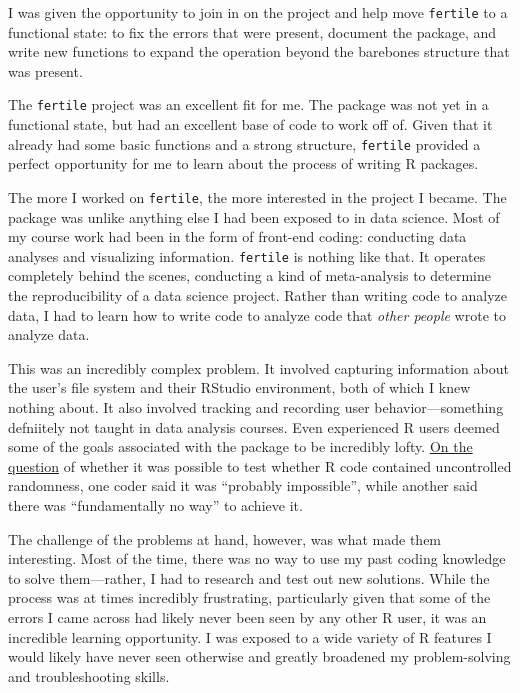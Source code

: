 \documentclass[12pt,twoside]{reedthesis}
\begin{document}
I was given the opportunity to join in on the project and help move \texttt{fertile} to a functional state: to fix the errors that were present, document the package, and write new functions to expand the operation beyond the barebones structure that was present.

The \texttt{fertile} project was an excellent fit for me. The package was not yet in a functional state, but had an excellent base of code to work off of. Given that it already had some basic functions and a strong structure, \texttt{fertile} provided a perfect opportunity for me to learn about the process of writing R packages.

The more I worked on \texttt{fertile}, the more interested in the project I became. The package was unlike anything else I had been exposed to in data science. Most of my course work had been in the form of front-end coding: conducting data analyses and visualizing information. \texttt{fertile} is nothing like that. It operates completely behind the scenes, conducting a kind of meta-analysis to determine the reproducibility of a data science project. Rather than writing code to analyze data, I had to learn how to write code to analyze code that \emph{other people} wrote to analyze data.

This was an incredibly complex problem. It involved capturing information about the user's file system and their RStudio environment, both of which I knew nothing about. It also involved tracking and recording user behavior---something defniitely not taught in data analysis courses. Even experienced R users deemed some of the goals associated with the package to be incredibly lofty. \href{https://stackoverflow.com/questions/43638773/comprehensive-way-to-check-for-functions-that-use-the-random-number-generator-in}{On the question} of whether it was possible to test whether R code contained uncontrolled randomness, one coder said it was ``probably impossible'', while another said there was ``fundamentally no way'' to achieve it.

The challenge of the problems at hand, however, was what made them interesting. Most of the time, there was no way to use my past coding knowledge to solve them---rather, I had to research and test out new solutions. While the process was at times incredibly frustrating, particularly given that some of the errors I came across had likely never been seen by any other R user, it was an incredible learning opportunity. I was exposed to a wide variety of R features I would likely have never seen otherwise and greatly broadened my problem-solving and troubleshooting skills.
\end{document}
